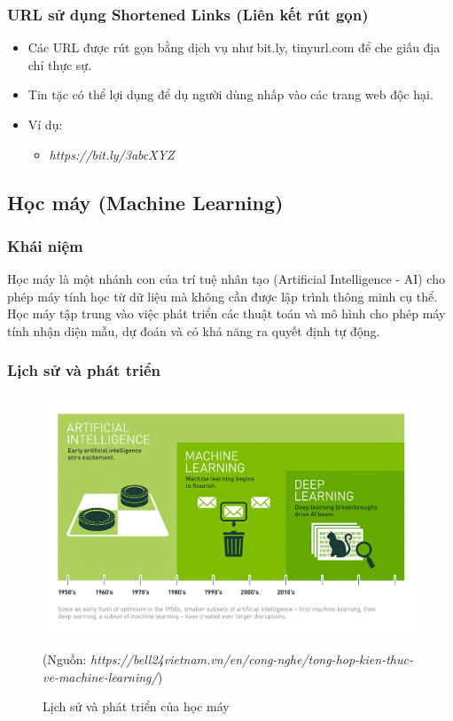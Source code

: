 \documentclass[13pt]{article}
\begin{document}
\subsubsection{URL sử dụng Shortened Links (Liên kết rút gọn)}
\begin{itemize}
    \item Các URL được rút gọn bằng dịch vụ như bit.ly, tinyurl.com để che giấu địa chỉ thực sự.
    \item Tin tặc có thể lợi dụng để dụ người dùng nhấp vào các trang web độc hại.
    \item Ví dụ:
    \begin{itemize}
        \item \textit{https://bit.ly/3abcXYZ}
    \end{itemize}
\end{itemize}


\subsection{Học máy (Machine Learning)}
    
    
\subsubsection{Khái niệm}
    Học máy là một nhánh con của trí tuệ nhân tạo (Artificial Intelligence - AI) cho phép máy tính học từ dữ liệu mà không cần được lập trình thông minh cụ thể. Học máy tập trung vào việc phát triển các thuật toán và mô hình cho phép máy tính nhận diện mẫu, dự đoán và có khả năng ra quyết định tự động.

\subsubsection{Lịch sử và phát triển}

    \begin{figure}[h!]
        \centering        \includegraphics[width=0.7\linewidth]{image/h3.png}
            \caption{Lịch sử và phát triển của học máy}
            \label{fig:label1}
            (Nguồn: \textit{https://bell24vietnam.vn/en/cong-nghe/tong-hop-kien-thuc-ve-machine-learning/})
    \end{figure}
\end{document}
